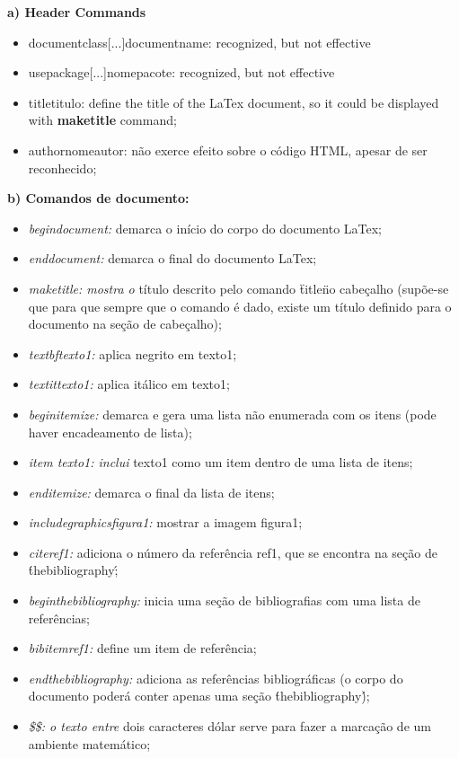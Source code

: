 \documentclass{article}
\begin{document}
\begin{itemzie}

	\item \textbf{a) Header Commands}
		\begin{itemize}
			 \item documentclass[...]{documentname}: recognized, but not effective
			 \item usepackage[...]{nomepacote}:  recognized, but not effective
			 \item title{titulo}: define the title of the LaTex document, so it could be displayed with \textbf{maketitle} command;
			 \item author{nomeautor}: não exerce efeito sobre o código HTML, apesar de ser reconhecido;
		\end{itemize}

	\item \textbf{b) Comandos de documento:}
		\begin{itemize}
	 		\item \textit{begin{document}:} demarca o início do corpo do documento LaTex;
	 		\item \textit{end{document}:} demarca o final do documento LaTex;
	 		\item \textit{maketitle: mostra o} título descrito pelo comando \"title\" no cabeçalho (supõe-se que para que sempre que o comando é dado, existe um título definido para o documento na seção de cabeçalho);
	 		\item \textit{textbf{texto1}:} aplica negrito em texto1;
	 		\item \textit{textit{texto1}:} aplica itálico em texto1;
	 		\item \textit{begin{itemize}:} demarca e gera uma lista não enumerada com os itens (pode haver encadeamento de lista);
	 		\item \textit{item texto1: inclui} texto1 como um item dentro de uma lista de itens; 
	 		\item \textit{end{itemize}:} demarca o final da lista de itens;
	 		\item \textit{includegraphics{figura1}:} mostrar a imagem figura1;
	 		\item \textit{cite{ref1}:} adiciona o número da referência ref1, que se encontra na seção de \'thebibliography\';
	 		\item \textit{begin{thebibliography}:} inicia uma seção de bibliografias com uma lista de referências;
	 		\item \textit{bibitem{ref1}:} define um item de referência;
	 		\item \textit{end{thebibliography}:} adiciona as referências bibliográficas (o corpo do documento poderá conter apenas uma seção \'thebibliography\');
	 		\item \textit{\$\$: o texto entre} dois caracteres dólar serve para fazer a marcação de um ambiente matemático;
		\end{itemize}


\end{itemzie}
\end{document}
